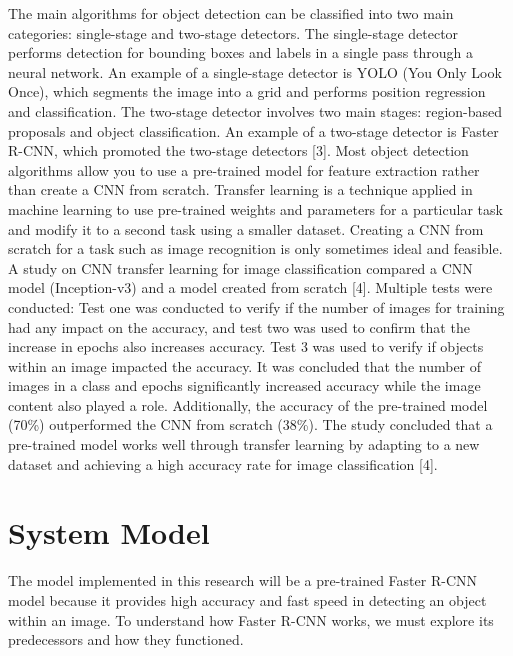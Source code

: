 \documentclass[conference]{IEEEtran}
\begin{document}
    The main algorithms for object detection can be classified into two main categories: single-stage and two-stage detectors. The single-stage detector 
    performs detection for bounding boxes and labels in a single pass through a neural network. An example of a single-stage detector is YOLO (You Only Look Once), 
    which segments the image into a grid and performs position regression and classification. The two-stage detector involves two main stages: region-based proposals 
    and object classification. An example of a two-stage detector is Faster R-CNN, which promoted the two-stage detectors [3]. Most object detection algorithms allow 
    you to use a pre-trained model for feature extraction rather than create a CNN from scratch. Transfer learning is a technique applied in machine learning to use 
    pre-trained weights and parameters for a particular task and modify it to a second task using a smaller dataset. Creating a CNN from scratch for a task such as 
    image recognition is only sometimes ideal and feasible. A study on CNN transfer learning for image classification compared a CNN model (Inception-v3) and a model 
    created from scratch [4]. Multiple tests were conducted: Test one was conducted to verify if the number of images for training had any impact on the accuracy, and 
    test two was used to confirm that the increase in epochs also increases accuracy. Test 3 was used to verify if objects within an image impacted the accuracy. It was 
    concluded that the number of images in a class and epochs significantly increased accuracy while the image content also played a role. Additionally, the accuracy 
    of the pre-trained model (70\%) outperformed the CNN from scratch (38\%). The study concluded that a pre-trained model works well through transfer learning by 
    adapting to a new dataset and achieving a high accuracy rate for image classification [4]. 

\section{System Model}
    The model implemented in this research will be a pre-trained Faster R-CNN model because it provides high accuracy and fast speed in detecting an 
    object within an image. To understand how Faster R-CNN works, we must explore its predecessors and how they functioned. \\
\end{document}
